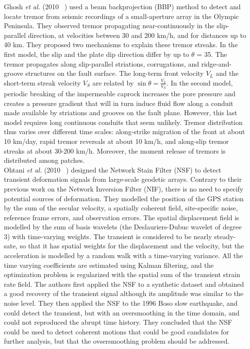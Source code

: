 \documentclass[main.tex]{subfiles}
\begin{document}
Ghosh \textit{et al.} (2010 ~\cite{GHO_2010_G3}) used a beam backprojection (BBP) method to detect and locate tremor from seismic recordings of a small-aperture array in the Olympic Peninsula. They observed tremor propagating near-continuously in the slip-parallel direction, at velocities between 30 and 200 km/h, and for distances up to 40 km. They proposed two mechanisms to explain these tremor streaks. In the first model, the slip and the plate dip direction differ by up to $\theta$ = 35\degree. The tremor propagates along slip-parallel striations, corrugations, and ridge-and-groove structures on the fault surface. The long-term front velocity $V_L$ and the short-term streak velocity $V_S$ are related by $\sin \theta = \frac{V_L}{V_S}$. In the second model, periodic breaking of the impermeable caprock increases the pore pressure and creates a pressure gradient that will in turn induce fluid flow along a conduit made available by striations and grooves on the fault plane. However, this last model requires long continuous conduits that seem unlikely. Tremor distribution thus varies over different time scales: along-strike migration of the front at about 10 km/day, rapid tremor reversals at about 10 km/h, and along-slip tremor streaks at about 30-200 km/h. Moreover, the moment release of tremors is distributed among patches. \\

Ohtani \textit{et al.} (2010 ~\cite{OHT_2010}) designed the Network Stain Filter (NSF) to detect transient deformation signals from large-scale geodetic arrays. Contrary to their previous work on the Network Inversion Filter (NIF), there is no need to specify potential sources of deformation. They modelled the position of the GPS station by the sum of the secular velocity, a spatially coherent field, site-specific noise, reference frame errors, and observation errors. The spatial displacement field is modelled by the sum of basis wavelets (the Deslauriers-Dubuc wavelet of degree 3) with time-varying weights. The transient is considered to be nearly steady-sate, so that it has spatial weights for the displacement and the velocity, but the acceleration is modelled by a random walk with a time-varying variance. All the time varying coefficients are estimated using Kalman filtering, and the optimization problem is regularized with the spatial sum of the transient strain rate field. The authors first applied the NSF to a synthetic dataset and obtained a good recovery of the transient signal although its amplitude was similar to the noise level. They then applied the NSF to the 1996 Boso slow earthquake, and could detect the transient, but with an oversmoothing in the time domain, and could not reproduced the abrupt time history. They concluded that the NSF could be used to detect coherent motions that could be good candidates for further analysis, but that the ovsersmoothing problem should be addressed. \\
\end{document}
